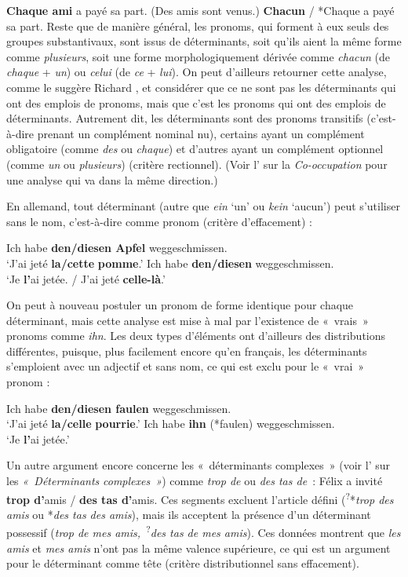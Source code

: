 \ea
\textbf{{Chaque ami}}  {a payé sa part.}
\z
\ea
    ({Des amis sont venus.}) \textbf{{Chacun} }{/}  {*Chaque a payé sa part.}
\z
Reste que de manière général, les pronoms, qui forment à eux seuls des groupes substantivaux, sont issus de déterminants, soit qu’ils aient la même forme comme \textit{plusieurs}, soit une forme morphologiquement dérivée comme \textit{chacun} (de \textit{chaque} + \textit{un}) ou \textit{celui} (de \textit{ce} + \textit{lui}). On peut d’ailleurs retourner cette analyse, comme le suggère Richard \citet[192]{Hudson2007}, et considérer que ce ne sont pas les déterminants qui ont des emplois de pronoms, mais que c’est les pronoms qui ont des emplois de déterminants. Autrement dit, les déterminants sont des pronoms transitifs (c’est-à-dire prenant un complément nominal nu), certains ayant un complément obligatoire (comme \textit{des} ou \textit{chaque}) et d’autres ayant un complément optionnel (comme \textit{un} ou \textit{plusieurs}) (critère rectionnel). (Voir l’ sur la \textit{Co-occupation} pour une analyse qui va dans la même direction.)

En allemand, tout déterminant (autre que \textit{ein} ‘un’ ou \textit{kein} ‘aucun’) peut s’utiliser sans le nom, c’est-à-dire comme pronom (critère d’effacement) :

\ea
{Ich habe} \textbf{{den/diesen}  {Apfel}}  {weggeschmissen.}\\
‘J’ai jeté \textbf{la/cette} \textbf{pomme}.’
\z
\ea
{Ich habe} \textbf{{den/diesen}}  {weggeschmissen.}\\
‘Je \textbf{l’}ai jetée. / J’ai jeté \textbf{celle-là}.’
\z

On peut à nouveau postuler un pronom de forme identique pour chaque déterminant, mais cette analyse est mise à mal par l’existence de «~vrais~» pronoms comme \textit{ihn}. Les deux types d’éléments ont d’ailleurs des distributions différentes, puisque, plus facilement encore qu’en français, les déterminants s’emploient avec un adjectif et sans nom, ce qui est exclu pour le «~vrai~» pronom :

\ea
{Ich habe} \textbf{{den/diesen}  {faulen} } {weggeschmissen.}\\
‘J’ai jeté \textbf{la/celle} \textbf{pourrie}.’
\z
\ea
{Ich habe} \textbf{{ihn}} (*{faulen})  {weggeschmissen.}\\
  ‘Je \textbf{l’}ai jetée.’
\z

Un autre argument encore concerne les «~déterminants complexes~» (voir l’ sur les \textit{«~Déterminants} \textit{complexes~»}) comme \textit{trop de} ou \textit{des tas de~}:
\ea
    {Félix a invité} \textbf{{trop d’}}{amis} / \textbf{{des tas d’}}{amis.}
\z
Ces segments excluent l’article défini (\textsuperscript{?}*\textit{trop des amis} ou *\textit{des tas des amis}), mais ils acceptent la présence d’un déterminant possessif (\textit{trop de mes amis,~}\textsuperscript{?}\textit{des tas de mes amis}). Ces données montrent que \textit{les amis} et \textit{mes amis} n’ont pas la même valence supérieure, ce qui est un argument pour le déterminant comme tête (critère distributionnel sans effacement).

